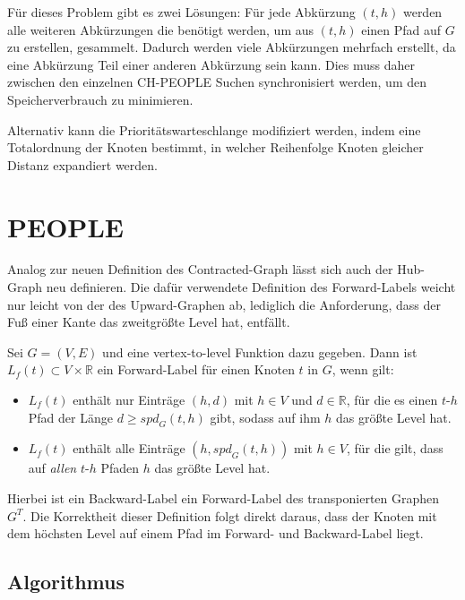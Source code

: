 Für dieses Problem gibt es zwei Lösungen:
Für jede Abkürzung $(t, h)$ werden alle weiteren Abkürzungen die benötigt werden, um aus $(t, h)$ einen Pfad auf $G$ zu erstellen, gesammelt.
Dadurch werden viele Abkürzungen mehrfach erstellt, da eine Abkürzung Teil einer anderen Abkürzung sein kann.
Dies muss daher zwischen den einzelnen CH-PEOPLE Suchen synchronisiert werden, um den Speicherverbrauch zu minimieren.

Alternativ kann die Prioritätswarteschlange modifiziert werden, indem eine Totalordnung der Knoten bestimmt, in welcher Reihenfolge Knoten gleicher Distanz expandiert werden.

\section{PEOPLE}

Analog zur neuen Definition des Contracted-Graph lässt sich auch der Hub-Graph neu definieren.
Die dafür verwendete Definition des Forward-Labels weicht nur leicht von der des Upward-Graphen ab, lediglich die Anforderung, dass der Fuß einer Kante das zweitgrößte Level hat, entfällt.

\begin{definition}
  Sei $G = (V, E)$ und eine vertex-to-level Funktion dazu gegeben.
  Dann ist $L_f (t) \subset V \times \mathbb{R}$ ein Forward-Label für einen Knoten $t$ in $G$, wenn gilt:

  \begin{itemize}
    \item
          $L_f (t)$ enthält nur Einträge $(h, d)$ mit $h \in V$ und $d \in \mathbb{R}$, für die es einen $t$-$h$ Pfad der Länge $d \geq {spd}_G (t, h)$ gibt, sodass auf ihm $h$ das größte Level hat.

    \item
          $L_f (t)$ enthält alle Einträge $(h, {spd}_G (t, h))$ mit $h \in V$, für die gilt, dass auf \emph{allen} $t$-$h$ Pfaden $h$ das größte Level hat.
  \end{itemize}
\end{definition}


Hierbei ist ein Backward-Label ein Forward-Label des transponierten Graphen $G^T$.
Die Korrektheit dieser Definition folgt direkt daraus, dass der Knoten mit dem höchsten Level auf einem Pfad im Forward- und Backward-Label liegt.

\subsection{Algorithmus}

